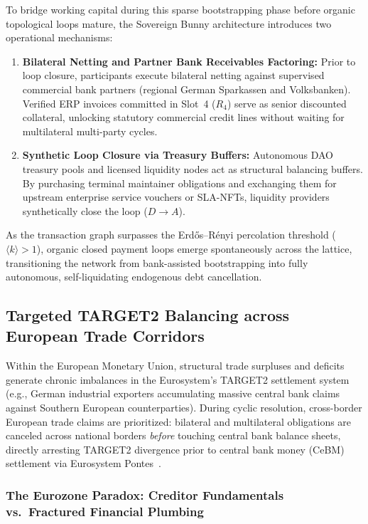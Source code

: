 \documentclass[a4paper,11pt,twoside,parskip=half-,headings=small]{scrartcl}
\begin{document}
To bridge working capital during this sparse bootstrapping phase before organic topological loops mature, the Sovereign Bunny architecture introduces two operational mechanisms:
\begin{enumerate}
  \item \textbf{Bilateral Netting and Partner Bank Receivables Factoring:} Prior to loop closure, participants execute bilateral netting against supervised commercial bank partners (regional German Sparkassen and Volksbanken). Verified ERP invoices committed in Slot~4 ($R_4$) serve as senior discounted collateral, unlocking statutory commercial credit lines without waiting for multilateral multi-party cycles.
  \item \textbf{Synthetic Loop Closure via Treasury Buffers:} Autonomous DAO treasury pools and licensed liquidity nodes act as structural balancing buffers. By purchasing terminal maintainer obligations and exchanging them for upstream enterprise service vouchers or SLA-NFTs, liquidity providers synthetically close the loop ($D \to A$).
\end{enumerate}
As the transaction graph surpasses the Erd\H{o}s--R\'enyi percolation threshold ($\langle k \rangle > 1$), organic closed payment loops emerge spontaneously across the lattice, transitioning the network from bank-assisted bootstrapping into fully autonomous, self-liquidating endogenous debt cancellation.

\subsection{Targeted TARGET2 Balancing across European Trade Corridors}
\label{sec:target2_balancing}

Within the European Monetary Union, structural trade surpluses and deficits generate
chronic imbalances in the Eurosystem's TARGET2 settlement system~\cite{sinn2012target} (e.g., German industrial
exporters accumulating massive central bank claims against Southern European counterparties).
During cyclic resolution, cross-border European trade claims are prioritized: bilateral and multilateral obligations are canceled across national borders \emph{before} touching central bank balance sheets, directly arresting TARGET2 divergence prior to central bank money (CeBM) settlement via Eurosystem Pontes~\cite{ecbpontes}.

\subsubsection{The Eurozone Paradox: Creditor Fundamentals vs.\ Fractured Financial Plumbing}
\label{sec:eurozone_paradox}
\end{document}
